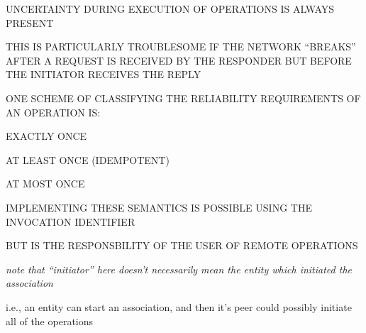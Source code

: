\begin{bwslide}

\begin{nrtc}
\item	UNCERTAINTY DURING EXECUTION OF OPERATIONS IS ALWAYS PRESENT

\item	THIS IS PARTICULARLY TROUBLESOME IF THE NETWORK ``BREAKS''
	AFTER A REQUEST IS RECEIVED BY THE RESPONDER BUT BEFORE
	THE INITIATOR RECEIVES THE REPLY

\item	ONE SCHEME OF CLASSIFYING THE RELIABILITY REQUIREMENTS OF AN OPERATION
	IS:
    \begin{nrtc}
    \item	EXACTLY ONCE

    \item	AT LEAST ONCE (IDEMPOTENT)

    \item	AT MOST ONCE
    \end{nrtc}

\item	IMPLEMENTING THESE SEMANTICS IS POSSIBLE USING THE INVOCATION
	IDENTIFIER
    \begin{nrtc}
    \item	BUT IS THE RESPONSBILITY OF THE USER OF REMOTE OPERATIONS
    \end{nrtc}
\end{nrtc}
\end{bwslide}


\begin{note}\em
note that ``initiator'' here doesn't necessarily mean the entity which
initiated the association

i.e., an entity can start an association, and then it's peer could possibly
initiate all of the operations
\end{note}



